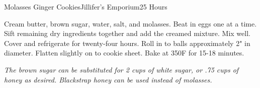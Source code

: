 \begin{recipe}{Molasses Ginger Cookies}{Jillifer's Emporium}{25 Hours}

  Cream butter, brown sugar, water, salt, and molasses. Beat in eggs one at a
  time. Sift remaining dry ingredients together and add the creamed
  mixture. Mix well. Cover and refrigerate for twenty-four hours. Roll in to
  balls approximately 2" in diameter. Flatten slightly on to cookie
  sheet. Bake at 350\0F for 15-18 minutes.
\end{recipe}
\textit{The brown sugar can be substituted for 2 cups of white sugar, or .75
  cups of honey as desired. Blackstrap honey can be used instead of molasses.}
